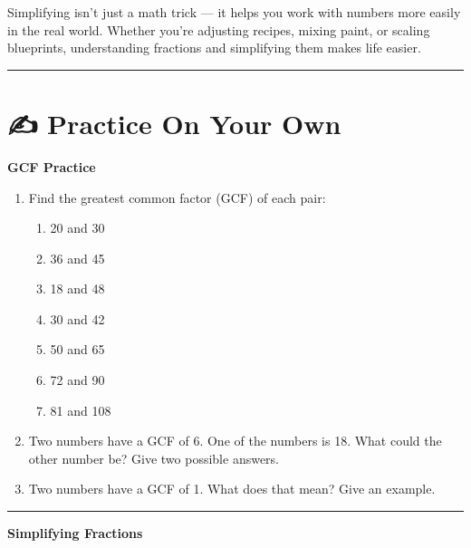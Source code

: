 \documentclass[
  letterpaper,
  DIV=11,
  numbers=noendperiod]{scrreprt}
\providecommand{\tightlist}{%
  \setlength{\itemsep}{0pt}\setlength{\parskip}{0pt}}
\begin{document}
Simplifying isn't just a math trick --- it helps you work with numbers
more easily in the real world. Whether you're adjusting recipes, mixing
paint, or scaling blueprints, understanding fractions and simplifying
them makes life easier.

\begin{center}\rule{0.5\linewidth}{0.5pt}\end{center}

\section*{✍️ Practice On Your Own}\label{practice-on-your-own-2}


\textbf{GCF Practice}

\begin{enumerate}
\def\labelenumi{\arabic{enumi}.}
\item
  Find the greatest common factor (GCF) of each pair:

  \begin{enumerate}
  \def\labelenumii{\alph{enumii}.}
  \tightlist
  \item
    20 and 30
  \item
    36 and 45
  \item
    18 and 48
  \item
    30 and 42
  \item
    50 and 65
  \item
    72 and 90
  \item
    81 and 108
  \end{enumerate}
\item
  Two numbers have a GCF of 6. One of the numbers is 18. What could the
  other number be? Give two possible answers.
\item
  Two numbers have a GCF of 1. What does that mean? Give an example.
\end{enumerate}

\begin{center}\rule{0.5\linewidth}{0.5pt}\end{center}

\textbf{Simplifying Fractions}
\end{document}
